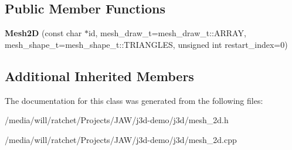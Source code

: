 \subsection*{Public Member Functions}
\begin{DoxyCompactItemize}
\item 
\hypertarget{classj3d_1_1Mesh2D_a02973553a23ee4ad8e6c391032df7b44}{}{\bfseries Mesh2\+D} (const char $\ast$id, mesh\+\_\+draw\+\_\+t=mesh\+\_\+draw\+\_\+t\+::\+A\+R\+R\+A\+Y, mesh\+\_\+shape\+\_\+t=mesh\+\_\+shape\+\_\+t\+::\+T\+R\+I\+A\+N\+G\+L\+E\+S, unsigned int restart\+\_\+index=0)\label{classj3d_1_1Mesh2D_a02973553a23ee4ad8e6c391032df7b44}

\end{DoxyCompactItemize}
\subsection*{Additional Inherited Members}


The documentation for this class was generated from the following files\+:\begin{DoxyCompactItemize}
\item 
/media/will/ratchet/\+Projects/\+J\+A\+W/j3d-\/demo/j3d/mesh\+\_\+2d.\+h\item 
/media/will/ratchet/\+Projects/\+J\+A\+W/j3d-\/demo/j3d/mesh\+\_\+2d.\+cpp\end{DoxyCompactItemize}
